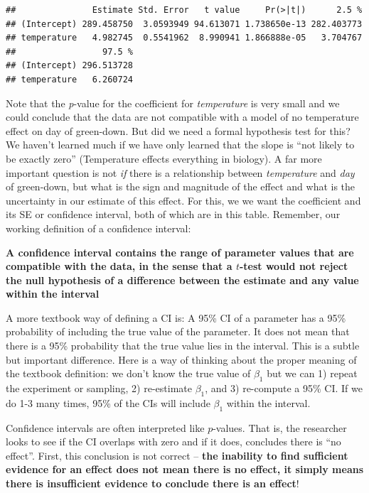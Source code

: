 \documentclass[]{book}
\begin{document}
\begin{verbatim}
##               Estimate Std. Error   t value     Pr(>|t|)      2.5 %
## (Intercept) 289.458750  3.0593949 94.613071 1.738650e-13 282.403773
## temperature   4.982745  0.5541962  8.990941 1.866888e-05   3.704767
##                 97.5 %
## (Intercept) 296.513728
## temperature   6.260724
\end{verbatim}

Note that the \emph{p}-value for the coefficient for \emph{temperature} is very small and we could conclude that the data are not compatible with a model of no temperature effect on day of green-down. But did we need a formal hypothesis test for this? We haven't learned much if we have only learned that the slope is ``not likely to be exactly zero'' (Temperature effects everything in biology). A far more important question is not \emph{if} there is a relationship between \emph{temperature} and \emph{day} of green-down, but what is the sign and magnitude of the effect and what is the uncertainty in our estimate of this effect. For this, we we want the coefficient and its SE or confidence interval, both of which are in this table. Remember, our working definition of a confidence interval:

\textbf{A confidence interval contains the range of parameter values that are compatible with the data, in the sense that a \(t\)-test would not reject the null hypothesis of a difference between the estimate and any value within the interval}

A more textbook way of defining a CI is: A 95\% CI of a parameter has a 95\% probability of including the true value of the parameter. It does not mean that there is a 95\% probability that the true value lies in the interval. This is a subtle but important difference. Here is a way of thinking about the proper meaning of the textbook definition: we don't know the true value of \(\beta_1\) but we can 1) repeat the experiment or sampling, 2) re-estimate \(\beta_1\), and 3) re-compute a 95\% CI. If we do 1-3 many times, 95\% of the CIs will include \(\beta_1\) within the interval.

Confidence intervals are often interpreted like \(p\)-values. That is, the researcher looks to see if the CI overlaps with zero and if it does, concludes there is ``no effect''. First, this conclusion is not correct -- \textbf{the inability to find sufficient evidence for an effect does not mean there is no effect, it simply means there is insufficient evidence to conclude there is an effect}!
\end{document}
